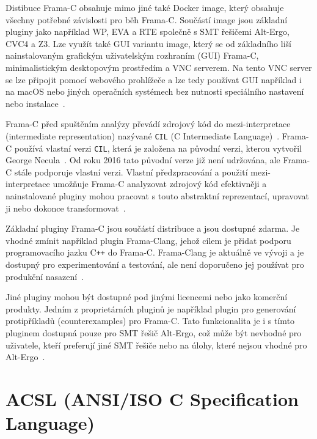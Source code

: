 Distibuce Frama\mbox{-}C obsahuje mimo jiné také Docker image,
který obsahuje všechny potřebné závislosti pro běh Frama\mbox{-}C\@.
Součástí image jsou základní pluginy jako například WP, EVA a RTE
společně s SMT řešičemi Alt-Ergo, CVC4 a Z3.
Lze využít také GUI variantu image, který se od základního liší
nainstalovaným grafickým uživatelským rozhraním (GUI) Frama\mbox{-}C,
minimalistickým desktopovým prostředím a VNC serverem.
Na tento VNC server se lze připojit pomocí webového prohlížeče
a lze tedy používat GUI například i na macOS nebo jiných operačních systémech
bez nutnosti speciálního nastavení nebo instalace~\cite{FCDockerGUIMaroneze2021}.


Frama\mbox{-}C před spuštěním analýzy převádí zdrojový kód do mezi-interpretace (intermediate representation)
nazývané \texttt{CIL} (C Intermediate Language)~\cite{BlanchardACSL2024}.
Frama\mbox{-}C používá vlastní verzi \texttt{CIL}, která je založena na původní verzi, kterou vytvořil George Necula~\cite{Necula2002CIL}.
Od roku 2016 tato původní verze již není udržována, ale Frama\mbox{-}C stále podporuje vlastní verzi.
Vlastní předzpracování a použití mezi-interpretace umožňuje Frama\mbox{-}C
analyzovat zdrojový kód efektivněji a nainstalované pluginy mohou pracovat
s touto abstraktní reprezentací, upravovat ji nebo dokonce transformovat~\cite{FCKernelMaroneze2024}.

Základní pluginy Frama\mbox{-}C jsou součástí distribuce a jsou dostupné zdarma.
Je vhodné zmínit například plugin Frama\mbox{-}Clang, jehož cílem je
přidat podporu programovacího jazku C\texttt{++} do Frama\mbox{-}C\@.
Frama\mbox{-}Clang je aktuálně ve vývoji a je dostupný pro experimentování a testování,
ale není doporučeno jej používat pro produkční nasazení~\cite{framaclang}.

Jiné pluginy mohou být dostupné pod jinými licencemi nebo jako komerční produkty.
Jedním z proprietárních pluginů je například plugin pro generování protipříkladů
(counterexamples) pro Frama\mbox{-}C\@.
Tato funkcionalita je i s tímto pluginem dostupná pouze pro SMT řešič Alt-Ergo,
což může být nevhodné pro uživatele, kteří preferují jiné SMT řešiče nebo na úlohy,
které nejsou vhodné pro Alt-Ergo~\cite{framacounterexamples}.

\section{ACSL (ANSI/ISO C Specification Language)}
\label{sec:acsl}


